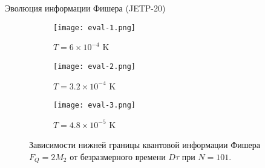 

\begin{frame}{Эволюция информации Фишера (JETP-20)}
  \begin{figure}
    \begin{subfigure}[t]{0.3\textwidth}
    \texttt{[image: eval-1.png]}
    \caption{$T = 6 \times 10^{-4}$ K}
    \end{subfigure}
    \hfill
    \begin{subfigure}[t]{0.3\textwidth}
      \texttt{[image: eval-2.png]}
      \caption{$T = 3.2 \times 10^{-4}$ K}
    \end{subfigure}
    \hfill
    \begin{subfigure}[t]{0.3\textwidth}
      \texttt{[image: eval-3.png]}
      \caption{$T = 4.8 \times 10^{-5}$ K}
    \end{subfigure}
    \caption{Зависимости нижней границы квантовой информации Фишера $F_Q = 2M_2$ от безразмерного времени $D\tau$ при $N = 101$.}
  \end{figure}
\end{frame}

